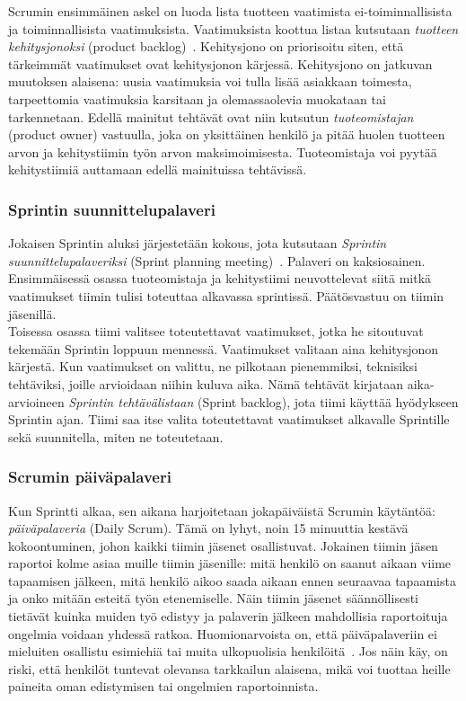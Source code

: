 \documentclass[finnish]{../tktltiki2}
\theoremstyle{definition}
\theoremstyle{remark}
\begin{document}
Scrumin ensimmäinen askel on luoda lista tuotteen vaatimista
ei-toiminnalli\-sista ja toiminnallisista vaatimuksista. Vaatimuksista
koottua listaa kutsutaan \emph{tuotteen kehitysjonoksi} (product backlog)~\cite{ScrumFinnishGuide}. Kehitysjono on priorisoitu siten, että tärkeimmät vaatimukset ovat kehitysjonon kärjessä. Kehitysjono on jatkuvan muutoksen alaisena: uusia vaatimuksia
voi tulla lisää asiakkaan toimesta, tarpeettomia vaatimuksia karsitaan ja olemassaolevia muokataan tai tarkennetaan. Edellä mainitut tehtävät
ovat niin kutsutun \emph{tuoteomistajan} (product owner) vastuulla,
joka on yksittäinen henkilö ja pitää huolen tuotteen arvon ja kehitystiimin työn arvon maksimoimisesta. Tuoteomistaja voi pyytää kehitystiimiä auttamaan edellä mainituissa tehtävissä.

\subsubsection{Sprintin suunnittelupalaveri}

Jokaisen Sprintin aluksi järjestetään kokous, jota kutsutaan \emph{Sprintin suunnittelupalaveriksi} (Sprint planning meeting)~\cite{ScrumHandBook}. Palaveri on kaksiosainen.
Ensimmäisessä osassa tuoteomistaja ja kehitystiimi neuvottelevat
siitä mitkä vaatimukset tiimin tulisi toteuttaa alkavassa
sprintissä. Päätösvastuu on tiimin jäsenillä.\\

Toisessa osassa tiimi valitsee toteutettavat vaatimukset, jotka
he sitoutuvat tekemään Sprintin loppuun mennessä. Vaatimukset
valitaan aina kehitysjonon kärjestä.
Kun vaatimukset on valittu, ne pilkotaan pienemmiksi, teknisiksi
tehtäviksi, joille arvioidaan niihin kuluva aika. Nämä tehtävät kirjataan aika-arvioineen \emph{Sprintin tehtävälistaan} (Sprint backlog), jota tiimi käyttää hyödykseen Sprintin ajan. Tiimi saa itse valita toteutettavat vaatimukset alkavalle Sprintille sekä suunnitella, miten ne toteutetaan.

\subsubsection{Scrumin päiväpalaveri}

Kun Sprintti alkaa, sen aikana harjoitetaan jokapäiväistä Scrumin käytäntöä:
\emph{päiväpalaveria} (Daily Scrum). Tämä on lyhyt, noin 15 minuuttia kestävä kokoontuminen, johon
kaikki tiimin jäsenet osallistuvat. Jokainen tiimin jäsen raportoi kolme asiaa muille tiimin jäsenille:
mitä henkilö on saanut aikaan viime tapaamisen jälkeen, mitä henkilö
aikoo saada aikaan ennen seuraavaa tapaamista ja onko mitään
esteitä työn etenemiselle. Näin tiimin jäsenet säännöllisesti tietävät
kuinka muiden työ edistyy ja palaverin jälkeen mahdollisia raportoituja
ongelmia voidaan yhdessä ratkoa. Huomionarvoista on, että päiväpalaveriin ei mieluiten osallistu esimiehiä tai muita
ulkopuolisia henkilöitä~\cite{ScrumHandBook}. Jos näin käy, on riski,
että henkilöt tuntevat olevansa tarkkailun alaisena, mikä voi
tuottaa heille paineita oman edistymisen tai ongelmien raportoinnista.
\end{document}
